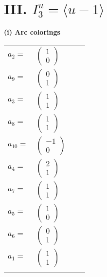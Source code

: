\documentclass[1p]{elsarticle_modified}
\theoremstyle{definition}
\begin{document}
\centering \section*{III. $I^u_{3}= \langle u-1 \rangle$}
\flushleft \textbf{(i) Arc colorings}\\
\begin{tabular}{m{7pt} m{180pt} m{7pt} m{180pt} }
\flushright $a_{2}=$&$\begin{pmatrix}1\\0\end{pmatrix}$ \\
\flushright $a_{9}=$&$\begin{pmatrix}0\\1\end{pmatrix}$ \\
\flushright $a_{3}=$&$\begin{pmatrix}1\\1\end{pmatrix}$ \\
\flushright $a_{8}=$&$\begin{pmatrix}1\\1\end{pmatrix}$ \\
\flushright $a_{10}=$&$\begin{pmatrix}-1\\0\end{pmatrix}$ \\
\flushright $a_{4}=$&$\begin{pmatrix}2\\1\end{pmatrix}$ \\
\flushright $a_{7}=$&$\begin{pmatrix}1\\1\end{pmatrix}$ \\
\flushright $a_{5}=$&$\begin{pmatrix}1\\0\end{pmatrix}$ \\
\flushright $a_{6}=$&$\begin{pmatrix}0\\1\end{pmatrix}$ \\
\flushright $a_{1}=$&$\begin{pmatrix}1\\1\end{pmatrix}$\\&\end{tabular}
\end{document}
